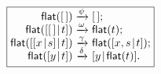 \documentclass[11pt]{article}
\begin{document}
\TeXtoEPS
\(
\boxed{
\begin{array}{@{}r@{\;}c@{\;}l@{}}
\fun{flat}(\el)                   & \xrightarrow{\smash{\psi}}
                                  & \el;\\
\fun{flat}(\cons{\el}{t})         & \xrightarrow{\smash{\omega}}
                                  & \fun{flat}(t);\\
\fun{flat}(\cons{\cons{x}{s}}{t}) & \xrightarrow{\smash{\gamma}}
                                  & \fun{flat}(\cons{x,s}{t});\\
\fun{flat}(\cons{y}{t})           & \xrightarrow{\smash{\delta}}
                                  & \cons{y}{\fun{flat}(t)}.
\end{array}}
\)
\endTeXtoEPS
\end{document}
